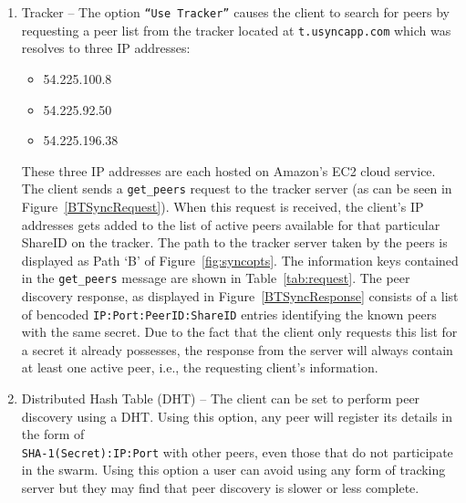 \documentclass[final,5p,times,twocolumn]{elsarticle}
\begin{document}
\begin{enumerate}
\item Tracker -- The option \texttt{``Use Tracker''} causes the client to search for peers by requesting a peer list from the tracker located at \texttt{t.usyncapp.com} which was resolves to three IP addresses: 
\begin{itemize}
\item 54.225.100.8
\item 54.225.92.50
\item 54.225.196.38
\end{itemize}
These three IP addresses are each hosted on Amazon's EC2 cloud service. The client sends a \texttt{get\_peers} request to the tracker server (as can be seen in Figure~\ref{BTSyncRequest}). When this request is received, the client's IP addresses gets added to the list of active peers available for that particular ShareID on the tracker. The path to the tracker server taken by the peers is displayed as Path `B' of Figure~\ref{fig:syncopts}. The information keys contained in the \texttt{get\_peers} message are shown in Table~\ref{tab:request}. The peer discovery response, as displayed in Figure~\ref{BTSyncResponse} consists of a list of bencoded \texttt{IP:Port:PeerID:ShareID} entries identifying the known peers with the same secret. Due to the fact that the client only requests this list for a secret it already possesses, the response from the server will always contain at least one active peer, i.e., the requesting client's information.

\begin{table}[!h]
\caption{Component Fields for Request Packet}
\label{tab:request}
\end{table}

\item Distributed Hash Table (DHT) -- The client can be set to perform peer discovery using a DHT. Using this option, any peer will register its details in the form of \\\texttt{SHA-1(Secret):IP:Port} with other peers, even those that do not participate in the swarm. Using this option a user can avoid using any form of tracking server but they may find that peer discovery is slower or less complete.
 

\end{enumerate}
\end{document}
